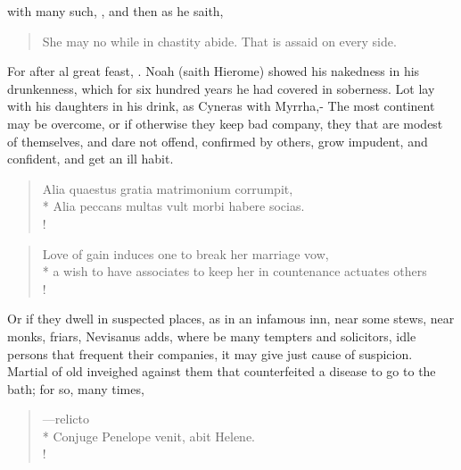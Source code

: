 with many such, \etc{}, and then as he saith,
%
\begin{verse}%
She may no while in chastity abide.
That is assaid on every side.
\end{verse}%

For after al great feast, .
Noah (saith Hierome) showed his nakedness in his drunkenness,
which for six hundred years he had covered in soberness. Lot lay with
his daughters in his drink, as Cyneras with Myrrha,- The most continent may be overcome, or if otherwise
they keep bad company, they that are modest of themselves, and dare not
offend, confirmed by others, grow impudent, and confident, and
get an ill habit.
%
\begin{latin}
\begin{verse}%
Alia quaestus gratia matrimonium corrumpit,\\*
Alia peccans multas vult morbi habere socias.\\!
\end{verse}%
\end{latin}
\translationrule%
\begin{verse}%
Love of gain induces one to break her marriage vow,\\*
a wish to have associates to keep her in countenance actuates others\\!
\end{verse}%
%

Or if they dwell in suspected places, as in an infamous inn, near some
stews, near monks, friars, Nevisanus adds, where be many tempters and
solicitors, idle persons that frequent their companies, it may give
just cause of suspicion. Martial of old inveighed against them that
counterfeited a disease to go to the bath; for so, many times,

\begin{latin}
\begin{verse}%
---relicto\\*
Conjuge Penelope venit, abit Helene.\\!
\end{verse}%
\end{latin}

